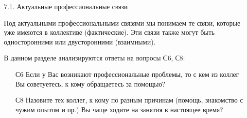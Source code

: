 \begin{frame}{7.1. Актуальные профессиональные связи }

\tiny
Под актуальными профессиональными связями мы понимаем те связи, которые уже имеются в коллективе (фактические). Эти связи также могут быть односторонними или двусторонними (взаимными).
\bigskip

В данном разделе анализируются ответы на вопросы С6, С8:
\bigskip

\begin{itemize}

\item [С6] Если у Вас возникают профессиональные проблемы, то с кем из коллег Вы советуетесь, к кому обращаетесь за помощью?

\item [С8] Назовите тех коллег, к кому по разным причинам (помощь, знакомство с чужим опытом и пр.) Вы чаще ходите на занятия в настоящее время?

\end{itemize}

\end{frame}


